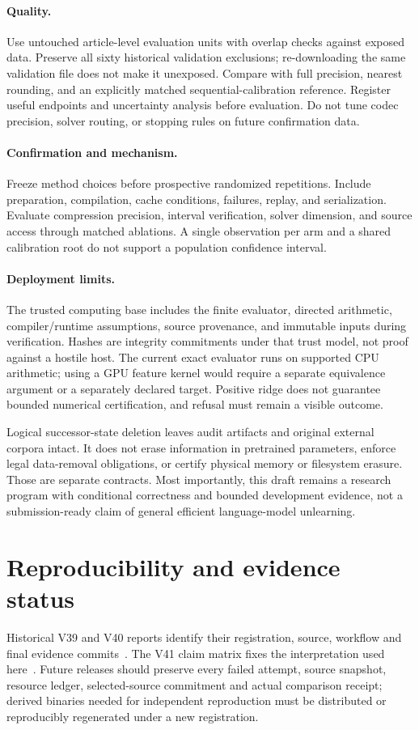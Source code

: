 \documentclass[10pt,twocolumn,letterpaper]{article}
\begin{document}
\paragraph{Quality.}
Use untouched article-level evaluation units with overlap checks against exposed
data. Preserve all sixty historical validation exclusions; re-downloading the
same validation file does not make it unexposed. Compare with full precision,
nearest rounding, and an explicitly matched sequential-calibration reference.
Register useful endpoints and uncertainty analysis before evaluation. Do not tune
codec precision, solver routing, or stopping rules on future confirmation data.

\paragraph{Confirmation and mechanism.}
Freeze method choices before prospective randomized repetitions. Include
preparation, compilation, cache conditions, failures, replay, and serialization.
Evaluate compression precision, interval verification, solver dimension, and
source access through matched ablations. A single observation per arm and a
shared calibration root do not support a population confidence interval.

\paragraph{Deployment limits.}
The trusted computing base includes the finite evaluator, directed arithmetic,
compiler/runtime assumptions, source provenance, and immutable inputs during
verification. Hashes are integrity commitments under that trust model, not proof
against a hostile host. The current exact evaluator runs on supported CPU
arithmetic; using a GPU feature kernel would require a separate equivalence
argument or a separately declared target. Positive ridge does not guarantee
bounded numerical certification, and refusal must remain a visible outcome.

Logical successor-state deletion leaves audit artifacts and original external
corpora intact. It does not erase information in pretrained parameters, enforce
legal data-removal obligations, or certify physical memory or filesystem erasure.
Those are separate contracts. Most importantly, this draft remains a research
program with conditional correctness and bounded development evidence, not a
submission-ready claim of general efficient language-model unlearning.

\section{Reproducibility and evidence status}
Historical V39 and V40 reports identify their registration, source, workflow and
final evidence commits~\cite{v39,v40}. The V41 claim matrix fixes the interpretation
used here~\cite{boundaries}. Future releases should preserve every failed attempt,
source snapshot, resource ledger, selected-source commitment and actual comparison
receipt; derived binaries needed for independent reproduction must be distributed
or reproducibly regenerated under a new registration.
\end{document}
